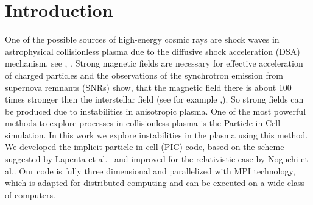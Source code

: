 \section{Introduction}
One of the possible sources of high-energy cosmic rays are shock waves in astrophysical collisionless plasma due to the diffusive shock acceleration (DSA) mechanism, see \cite{Bell1978}, \cite{Blandford1978}. Strong magnetic fields are necessary for effective acceleration of charged particles and the observations of the synchrotron emission from supernova remnants (SNRs) show, that the magnetic field there is about 100 times stronger then the interstellar field (see for example \cite{Berezhko2003},\cite{Uchiyama2007}). So strong fields can be produced due to instabilities in anisotropic plasma. One of the most powerful methods to explore processes in collisionless plasma is the Particle-in-Cell simulation. In this work we explore instabilities in the plasma using this method. 
We developed the implicit particle-in-cell (PIC) code, based on the scheme suggested by Lapenta et al.~\cite{Lapenta2006} and improved for the relativistic case by Noguchi et al.\cite{Noguchi2007}.
Our code is fully three dimensional and parallelized with MPI technology, which is adapted for distributed computing and can be executed on a wide class of computers.